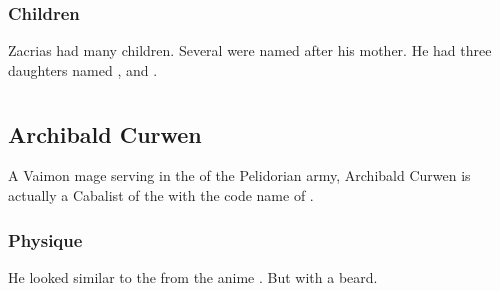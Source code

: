 \subsection{Children}
Zacrias had many children. 
Several were named after his mother. 
He had three daughters named \Belzir, \Delphine{} and \Shiaraid. 












































\chapter{\Thirdbanewar}
\section{Archibald Curwen}
A \human{} Vaimon mage serving in the \ishrah{} of the Pelidorian army, Archibald Curwen is actually a Cabalist of the  with the code name of . 

% 









\subsection{Physique}
He looked similar to the \JimushiJuubei{} from the anime \cite{Anime:Basilisk}. 
But with a beard. 

